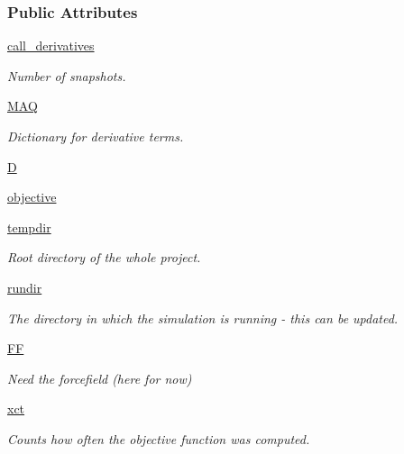 \subsubsection*{Public Attributes}
\begin{DoxyCompactItemize}
\item 
\hyperlink{classforcebalance_1_1leastsq_1_1LeastSquares_a58b3039968f72ab1a98e18deed0f8a0a}{call\-\_\-derivatives}
\begin{DoxyCompactList}\small\item\em Number of snapshots. \end{DoxyCompactList}\item 
\hyperlink{classforcebalance_1_1leastsq_1_1LeastSquares_a7f08641f45285414b080f21ed278f31e}{M\-A\-Q}
\begin{DoxyCompactList}\small\item\em Dictionary for derivative terms. \end{DoxyCompactList}\item 
\hyperlink{classforcebalance_1_1leastsq_1_1LeastSquares_aa2565a2a75466e9f759ba3a67b85d0d2}{D}
\item 
\hyperlink{classforcebalance_1_1leastsq_1_1LeastSquares_a169fd8ca94e8f36539ec4ccfa0af4902}{objective}
\item 
\hyperlink{classforcebalance_1_1target_1_1Target_aa1f01b5b78db253b5b66384ed11ed193}{tempdir}
\begin{DoxyCompactList}\small\item\em Root directory of the whole project. \end{DoxyCompactList}\item 
\hyperlink{classforcebalance_1_1target_1_1Target_a6872de5b2d4273b82336ea5b0da29c9e}{rundir}
\begin{DoxyCompactList}\small\item\em The directory in which the simulation is running -\/ this can be updated. \end{DoxyCompactList}\item 
\hyperlink{classforcebalance_1_1target_1_1Target_a38a37919783141ea37fdcf8b00ce0aaf}{F\-F}
\begin{DoxyCompactList}\small\item\em Need the forcefield (here for now) \end{DoxyCompactList}\item 
\hyperlink{classforcebalance_1_1target_1_1Target_aad2e385cfbf7b4a68f1c2cb41133fe82}{xct}
\begin{DoxyCompactList}\small\item\em Counts how often the objective function was computed. \end{DoxyCompactList}\item 

\end{DoxyCompactItemize}
